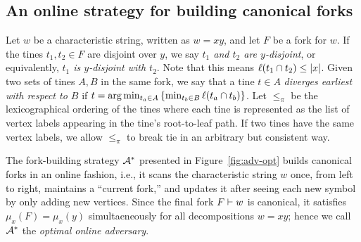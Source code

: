 \subsection{An online strategy for building canonical forks}
	Let $w$ be a characteristic string, 
	written as $w = xy$, and 
	let $F$ be a fork for $w$. 
	If the tines $t_1, t_2 \in F$ are disjoint over $y$, 
	we say \emph{$t_1$ and $t_2$ are $y$-disjoint}, or equivalently, 
	\emph{$t_1$ is $y$-disjoint with $t_2$}. 
	Note that this means $\ell(t_1 \cap t_2) \leq |x|$. 
	Given two sets of tines $A, B$ in the same fork, 
	we say that a tine $t \in A$ \emph{diverges earliest with respect to $B$} if 
	$t = \arg \min_{t_a \in A}\left\{ \min_{t_b \in B} \ell(t_a \cap t_b) \right\}$.	
	Let $\leq_\pi$ be the lexicographical ordering of the tines where 
	each tine is represented as the list of vertex labels appearing in the tine's root-to-leaf path.
	If two tines have the same vertex labels, 
	we allow $\leq_\pi$ to break tie in an arbitrary but consistent way. 

	The fork-building strategy $\mathcal{A}^*$ presented in Figure~\ref{fig:adv-opt} 
	builds canonical forks in an online fashion, i.e., 
	it scans the characteristic string $w$ once, from left to right, 
	maintains a ``current fork,'' 
	and updates it after seeing each new symbol by only adding new vertices. 
	Since the final fork $F \vdash w$ is canonical, 
	it satisfies $\mu_x(F) = \mu_x(y)$ simultaeneously for all decompositions $w = xy$; 
	hence we call $\mathcal{A}^*$ the \emph{optimal online adversary}. 








